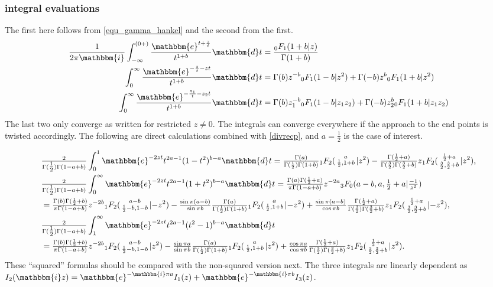 \documentclass[12pt]{article}
\newcommand{\ee}[0] {\mathbbm{e}}
\newcommand{\ii}[0] {\mathbbm{i}}
\newcommand{\dd}[0] {\mathbbm{d}}
\numberwithin{equation}{section}
\newcommand{\FFs}[6] {{}_{#1}{#2}_{#3} ( \begin{smallmatrix} #4 \\ #5 \end{smallmatrix} | {#6}  )}
\begin{document}
\subsubsection{integral evaluations}
The first here follows from \eqref{equ_gamma_hankel} and the second from the first.
\begin{align*}
\frac{1}{2\pi \ii} \int_{-\infty}^{(0+)} \frac{\ee^{t + \frac{z}{t}}}{t^{1+b}} \dd t &= \frac{{}_0 F_{1} (1+b|z)}{\Gamma(1+b)}\\
\int_{0}^{\infty} \frac{\ee^{-\frac{z}{t} - z t}}{t^{1+b}} \dd t & = \Gamma(b) z^{-b} {}_0 F_{1} (1-b|z^2) + \Gamma(-b) z^{b} {}_0 F_{1} (1+b|z^2) \\
\int_{0}^{\infty} \frac{\ee^{-\frac{z_1}{t} - z_2 t}}{t^{1+b}} \dd t & = \Gamma(b) z_1^{-b} {}_0 F_{1} (1-b|z_1 z_2) + \Gamma(-b) z_2^{b} {}_0 F_{1} (1+b| z_1 z_2)
\end{align*}
The last two only converge as written for restricted $z \ne 0$. The integrals can converge everywhere if the approach to the end points is twisted accordingly. The following are direct calculations combined with \eqref{divrecp}, and $a=\frac12$ is the case of interest.

\newcommand{\soltwo}[1] {\tfrac{\Gamma(b)\Gamma(\frac12+b)}{\pi \Gamma(1-a+b)} z^{-2b} \FFs{1}{F}{2}{a-b}{\frac12-b,1-b}{#1}}

\newcommand{\solzero}[1] {\tfrac{\Gamma(a)}{\Gamma(\frac12) \Gamma(1+b)} \FFs{1}{F}{2}{a}{\frac12,1+b}{#1}}

\newcommand{\solone}[1] {\tfrac{\Gamma(\frac12+a)}{\Gamma(\frac32) \Gamma(\frac32 + b)} z \FFs{1}{F}{2}{\frac12+a}{\frac32, \frac32+b}{#1}}

\begin{align*}
&\tfrac{2}{\Gamma(\tfrac12) \Gamma(1-a+b)} \int_0^1 \ee^{-2 z t} t^{2a-1} (1-t^2)^{b-a} \dd t = \solzero{z^2} - \solone{z^2}\text{,}\\
&\tfrac{2}{\Gamma(\tfrac12) \Gamma(1-a+b)} \int_0^{\infty} \ee^{-2 z t} t^{2a-1} (1+t^2)^{b-a} \dd t = \tfrac{\Gamma(a)\Gamma(\frac12+a)}{\pi \Gamma(1-a+b)} z^{-2a} {}_3 F_0(a-b,a,\tfrac12+a|\tfrac{-1}{z^2})\\
 &= \soltwo{-z^2} - \tfrac{\sin \pi (a-b)}{\sin \pi b} \solzero{-z^2} + \tfrac{\sin \pi (a-b)}{\cos \pi b} \solone{-z^2}\text{,}\\
 &\tfrac{2}{\Gamma(\tfrac12) \Gamma(1-a+b)} \int_1^{\infty} \ee^{-2 z t} t^{2a-1} (t^2-1)^{b-a} \dd t\\ 
&= \soltwo{z^2} - \tfrac{\sin \pi a}{\sin \pi b} \solzero{z^2} + \tfrac{\cos \pi a}{\cos \pi b} \solone{z^2}\text{.}
\end{align*}
\let\soltwo\undefined
\let\solone\undefined
\let\solzero\undefined
These ``squared'' formulas should be compared with the non-squared version next. The three integrals are linearly dependent as $I_2(\ii z) = \ee^{-\ii \pi a } I_1(z) + \ee^{-\ii \pi b} I_3(z)$.
\end{document}
